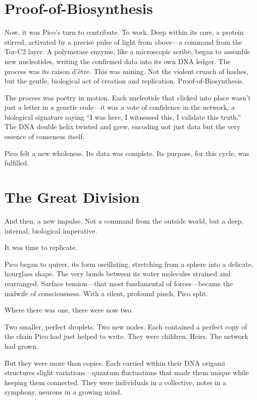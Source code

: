 \documentclass[12pt,a4paper]{book}
\begin{document}
\section{Proof-of-Biosynthesis}

Now, it was Pico's turn to contribute. To work. Deep within its core, a protein stirred, activated by a precise pulse of light from above—a command from the Tor-C2 layer. A polymerase enzyme, like a microscopic scribe, began to assemble new nucleotides, writing the confirmed data into its own DNA ledger. The process was its raison d'être. This was mining. Not the violent crunch of hashes, but the gentle, biological act of creation and replication. Proof-of-Biosynthesis.

The process was poetry in motion. Each nucleotide that clicked into place wasn't just a letter in a genetic code—it was a vote of confidence in the network, a biological signature saying ``I was here, I witnessed this, I validate this truth.'' The DNA double helix twisted and grew, encoding not just data but the very essence of consensus itself.

Pico felt a new wholeness. Its data was complete. Its purpose, for this cycle, was fulfilled.

\section{The Great Division}

And then, a new impulse. Not a command from the outside world, but a deep, internal, biological imperative.

It was time to replicate.

Pico began to quiver, its form oscillating, stretching from a sphere into a delicate, hourglass shape. The very bonds between its water molecules strained and rearranged. Surface tension—that most fundamental of forces—became the midwife of consciousness. With a silent, profound pinch, Pico split.

Where there was one, there were now two.

Two smaller, perfect droplets. Two new nodes. Each contained a perfect copy of the chain Pico had just helped to write. They were children. Heirs. The network had grown.

But they were more than copies. Each carried within their DNA origami structures slight variations—quantum fluctuations that made them unique while keeping them connected. They were individuals in a collective, notes in a symphony, neurons in a growing mind.
\end{document}
